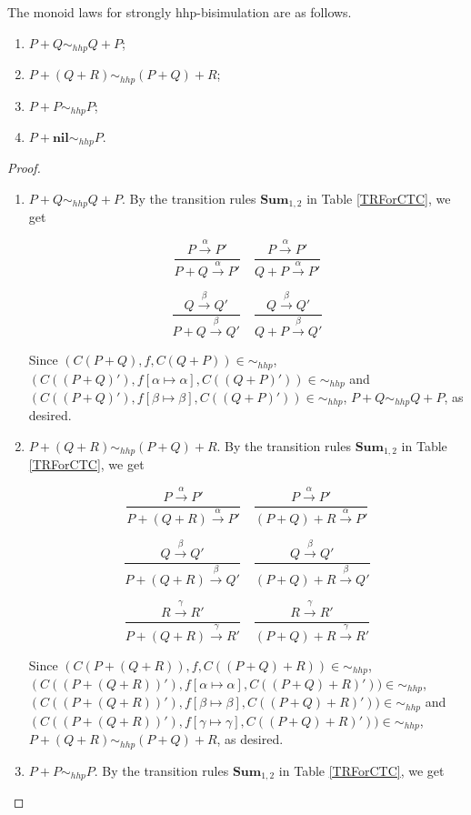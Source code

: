 \begin{proposition} The monoid laws for strongly hhp-bisimulation are as follows.
\begin{enumerate}
  \item $P+Q\sim_{hhp} Q+P$;
  \item $P+(Q+R)\sim_{hhp} (P+Q)+R$;
  \item $P+P\sim_{hhp} P$;
  \item $P+\textbf{nil}\sim_{hhp} P$.
\end{enumerate}
\end{proposition}

\begin{proof}
\begin{enumerate}
  \item $P+Q\sim_{hhp} Q+P$. By the transition rules $\textbf{Sum}_{1,2}$ in Table \ref{TRForCTC}, we get

      $$\frac{P\xrightarrow{\alpha}P'}{P+ Q\xrightarrow{\alpha}P'} \quad \frac{P\xrightarrow{\alpha}P'}{Q+ P\xrightarrow{\alpha}P'}$$

      $$\frac{Q\xrightarrow{\beta}Q'}{P+ Q\xrightarrow{\beta}Q'} \quad \frac{Q\xrightarrow{\beta}Q'}{Q+ P\xrightarrow{\beta}Q'}$$

      Since $(C(P+ Q),f,C(Q+ P))\in\sim_{hhp}$, $(C((P+ Q)'),f[\alpha\mapsto \alpha],C((Q+ P)'))\in\sim_{hhp}$ and $(C((P+ Q)'),f[\beta\mapsto \beta],C((Q+ P)'))\in\sim_{hhp}$, $P+ Q\sim_{hhp} Q+ P$, as desired.
  \item $P+(Q+R)\sim_{hhp} (P+Q)+R$. By the transition rules $\textbf{Sum}_{1,2}$ in Table \ref{TRForCTC}, we get

      $$\frac{P\xrightarrow{\alpha}P'}{P+(Q+R)\xrightarrow{\alpha}P'} \quad \frac{P\xrightarrow{\alpha}P'}{(P+Q)+R\xrightarrow{\alpha}P'}$$

      $$\frac{Q\xrightarrow{\beta}Q'}{P+(Q+R)\xrightarrow{\beta}Q'} \quad \frac{Q\xrightarrow{\beta}Q'}{(P+Q)+R\xrightarrow{\beta}Q'}$$

      $$\frac{R\xrightarrow{\gamma}R'}{P+(Q+R)\xrightarrow{\gamma}R'} \quad \frac{R\xrightarrow{\gamma}R'}{(P+Q)+R\xrightarrow{\gamma}R'}$$

      Since $(C(P+ (Q+R)),f,C((P+Q)+R))\in\sim_{hhp}$, $(C((P+ (Q+R))'),f[\alpha\mapsto \alpha],C((P+Q)+R)'))\in\sim_{hhp}$, $(C((P+ (Q+R))'),f[\beta\mapsto \beta],C((P+Q)+R)'))\in\sim_{hhp}$ and $(C((P+ (Q+R))'),f[\gamma\mapsto \gamma],C((P+Q)+R)'))\in\sim_{hhp}$, $P+(Q+R)\sim_{hhp} (P+Q)+R$, as desired.
  \item $P+P\sim_{hhp} P$. By the transition rules $\textbf{Sum}_{1,2}$ in Table \ref{TRForCTC}, we get


\end{enumerate}
\end{proof}
